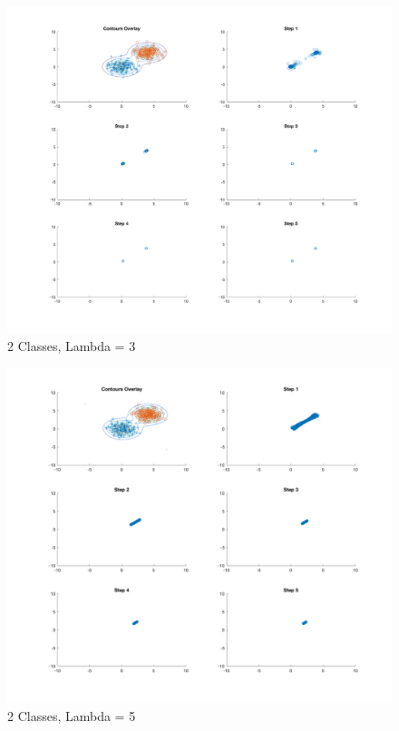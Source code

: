 \begin{figure}[H]
    \includegraphics[width=\linewidth]{../../pracs/week5/images/q3_2class_3}
    \centering
    \caption{2 Classes, Lambda = 3}
\end{figure}

\begin{figure}[H]
    \includegraphics[width=\linewidth]{../../pracs/week5/images/q3_2class_5}
    \centering
    \caption{2 Classes, Lambda = 5}
\end{figure}

